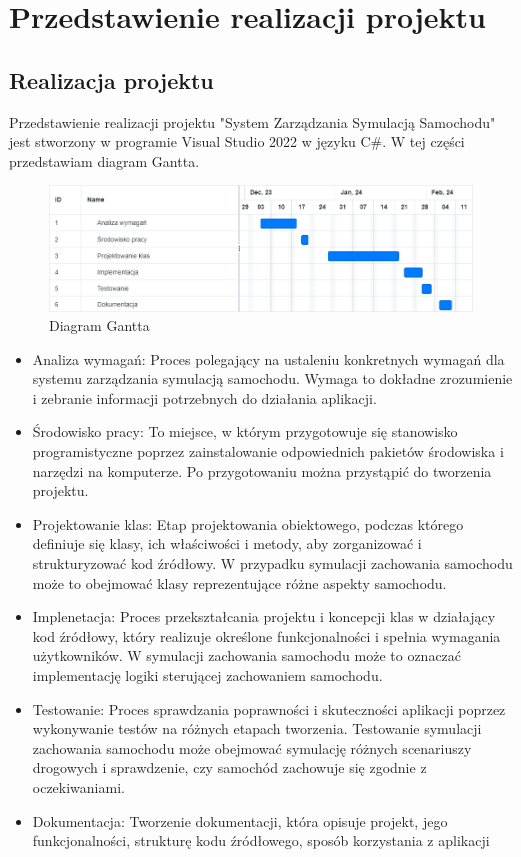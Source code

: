 ﻿%
\chapter{Przedstawienie realizacji projektu}
\section{Realizacja projektu}
Przedstawienie realizacji projektu "System Zarządzania Symulacją Samochodu" jest stworzony w programie Visual Studio 2022 w języku C\#. W tej części przedstawiam diagram Gantta.
\begin{figure}[!ht]
	\centering
		\includegraphics[width=17cm]{Diagram Gantta.png}
	\caption{\footnotesize Diagram Gantta}
	\label{fig:plotend}
\end{figure}

\begin{itemize}
\item Analiza wymagań: Proces polegający na ustaleniu konkretnych wymagań dla systemu zarządzania symulacją samochodu. Wymaga to dokładne zrozumienie i zebranie informacji potrzebnych do działania aplikacji.
\item Środowisko pracy: To miejsce, w którym przygotowuje się stanowisko programistyczne poprzez zainstalowanie odpowiednich pakietów środowiska i narzędzi na komputerze. Po przygotowaniu można przystąpić do tworzenia projektu.
\item Projektowanie klas: Etap projektowania obiektowego, podczas którego definiuje się klasy, ich właściwości i metody, aby zorganizować i strukturyzować kod źródłowy. W przypadku symulacji zachowania samochodu może to obejmować klasy reprezentujące różne aspekty samochodu.
\item Implenetacja: Proces przekształcania projektu i koncepcji klas w działający kod źródłowy, który realizuje określone funkcjonalności i spełnia wymagania użytkowników. W symulacji zachowania samochodu może to oznaczać implementację logiki sterującej zachowaniem samochodu.
\item Testowanie: Proces sprawdzania poprawności i skuteczności aplikacji poprzez wykonywanie testów na różnych etapach tworzenia. Testowanie symulacji zachowania samochodu może obejmować symulację różnych scenariuszy drogowych i sprawdzenie, czy samochód zachowuje się zgodnie z oczekiwaniami.
\item Dokumentacja: Tworzenie dokumentacji, która opisuje projekt, jego funkcjonalności, strukturę kodu źródłowego, sposób korzystania z aplikacji 
\end{itemize}

